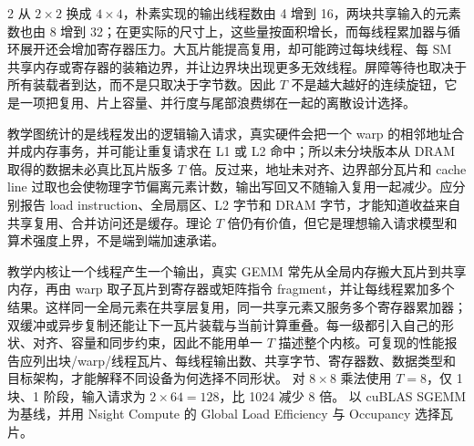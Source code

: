 \begin{solutionexercise}{2}
从 $2\times2$ 换成 $4\times4$，朴素实现的输出线程数由 4 增到 16，两块共享输入的元素数也由 8 增到 32；在更实际的尺寸上，这些量按面积增长，而每线程累加器与循环展开还会增加寄存器压力。大瓦片能提高复用，却可能跨过每块线程、每 SM 共享内存或寄存器的装箱边界，并让边界块出现更多无效线程。屏障等待也取决于所有装载者到达，而不是只取决于字节数。因此 $T$ 不是越大越好的连续旋钮，它是一项把复用、片上容量、并行度与尾部浪费绑在一起的离散设计选择。

教学图统计的是线程发出的逻辑输入请求，真实硬件会把一个 warp 的相邻地址合并成内存事务，并可能让重复请求在 L1 或 L2 命中；所以未分块版本从 DRAM 取得的数据未必真比瓦片版多 $T$ 倍。反过来，地址未对齐、边界部分瓦片和 cache line 过取也会使物理字节偏离元素计数，输出写回又不随输入复用一起减少。应分别报告 load instruction、全局扇区、L2 字节和 DRAM 字节，才能知道收益来自共享复用、合并访问还是缓存。理论 $T$ 倍仍有价值，但它是理想输入请求模型和算术强度上界，不是端到端加速承诺。

教学内核让一个线程产生一个输出，真实 GEMM 常先从全局内存搬大瓦片到共享内存，再由 warp 取子瓦片到寄存器或矩阵指令 fragment，并让每线程累加多个结果。这样同一全局元素在共享层复用，同一共享元素又服务多个寄存器累加器；双缓冲或异步复制还能让下一瓦片装载与当前计算重叠。每一级都引入自己的形状、对齐、容量和同步约束，因此不能用单一 $T$ 描述整个内核。可复现的性能报告应列出块/warp/线程瓦片、每线程输出数、共享字节、寄存器数、数据类型和目标架构，才能解释不同设备为何选择不同形状。
\variantheading 对 $8\times8$ 乘法使用 $T=8$，仅 1 块、1 阶段，输入请求为 $2\times64=128$，比 1024 减少 8 倍。
\practiceheading 以 cuBLAS SGEMM 为基线，并用 Nsight Compute 的 Global Load Efficiency 与 Occupancy 选择瓦片。
\end{solutionexercise}

